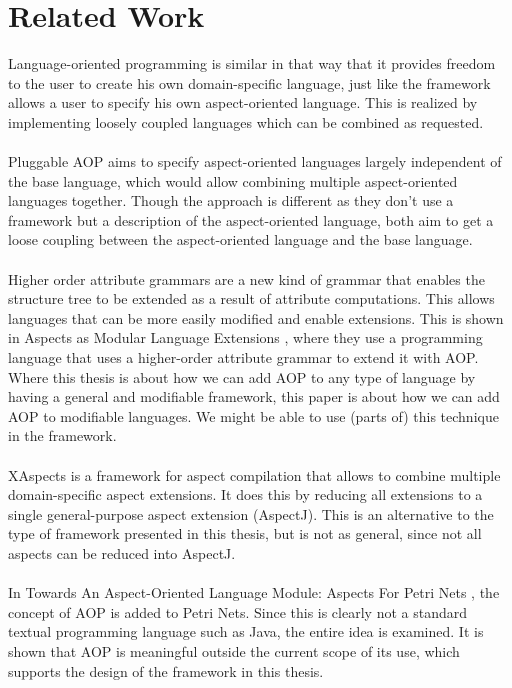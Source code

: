 \documentclass[a4paper]{report}
\begin{document}
\chapter{Related Work}
\label{chap:RelatedWork}
Language-oriented programming \citep{dmitriev_language_2004} is similar in that way that it provides freedom to the user to create his own domain-specific language, just like the framework allows a user to specify his own aspect-oriented language. This is realized by implementing loosely coupled languages which can be combined as requested.\\
\\
Pluggable AOP \citep{kojarski_pluggable_2005} aims to specify aspect-oriented languages largely independent of the base language, which would allow combining multiple aspect-oriented languages together.  Though the approach is different as they don't use a framework but a description of the aspect-oriented language, both aim to get a loose coupling between the aspect-oriented language and the base language.\\
\\
Higher order attribute grammars \citep{vogt_higher_1989} are a new kind of grammar that enables the structure tree to be extended as a result of attribute computations. This allows languages that can be more easily modified and enable extensions. This is shown in Aspects as Modular Language Extensions \citep{van_wyk_aspects_2003}, where they use a programming language that uses a higher-order attribute grammar to extend it with AOP. Where this thesis is about how we can add AOP to any type of language by having a general and modifiable framework, this paper is about how we can add AOP to modifiable languages. We might be able to use (parts of) this technique in the framework.\\
\\
XAspects \citep{shonle_xaspects:_2003} is a framework for aspect compilation that allows to combine multiple domain-specific aspect extensions. It does this by reducing all extensions to a single general-purpose aspect extension (AspectJ). This is an alternative to the type of framework presented in this thesis, but is not as general, since not all aspects can be reduced into AspectJ.\\
\\
In Towards An Aspect-Oriented Language Module: Aspects For Petri Nets \citep{molderez_towards_2012}, the concept of AOP is added to Petri Nets. Since this is clearly not a standard textual programming language such as Java, the entire idea is examined. It is shown that AOP is meaningful outside the current scope of its use, which supports the design of the framework in this thesis.
\end{document}
